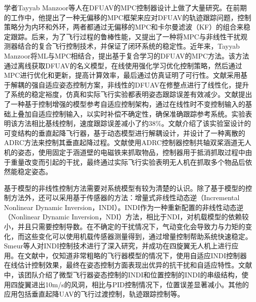 学者Tayyab Manzoor等人在DFUAV的MPC控制器设计上做了大量研究。在前期的工作中，他提出了一种无偏移的MPC框架来应对DFUAV的轨迹跟踪问题\cite{manzoorTrajectoryTrackingControl2020}，控制策略分为内环和外环，两者都通过无偏移的MPC和卡尔曼滤波（KF）的组合来稳定跟踪。后来，为了飞行过程的鲁棒性能，又提出了一种将MPC与非线性干扰观测器结合的复合飞行控制技术\cite{manzoorMPCBasedCompound2020,manzoorCompositeObserverbasedRobust2023}，并保证了闭环系统的稳定性。近年来，Tayyab Manzoor将ML与MPC相结合，提出基于复合学习的DFUAV的MPC方法\cite{manzoorModelPredictiveControl2023,manzoorCompoundLearningBasedModel2024}。该方法通过离线获取DFUAV的名义模型，在线使用强化学习优化控制策略，然后通过MPC进行优化和更新，提高计算效率，最后通过仿真证明了可行性。文献\parencite{zhaoModellingAttitudeControl2015}采用基于解耦的强自适应姿态控制方案，非线性的DFUAV在修整点进行了线性化，提升了系统的稳定裕度，仿真和实际飞行实验都表明姿态跟踪误差有效减少。文献\parencite{aiRobustAdaptiveControl2025}提出了一种基于控制增强的模型参考自适应控制架构，通过在线性时不变控制输入的基础上叠加自适应控制输入，以实时补偿不确定性，确保准确跟踪参考系统。实验表明该方法相比基线控制，速度跟踪误差减小了约38\%。文献\parencite{wenResearchVerticalTakeoff2021}介绍了该实验室设计的可变结构的垂直起降飞行器，基于动态模型进行解耦设计，并设计了一种离散的ADRC方法来控制其垂直起降过程。文献\parencite{yinDuctedFanUAV2024}使用ADRC控制器控制共轴双桨涵道无人机的姿态，使用固定于涵道壁的电磁铁来抓取物品，控制器用于抵消抓取过程中由于重量改变而引起的干扰，最终通过实际飞行实验表明无人机在抓取多个物品后依然能稳定姿态。

基于模型的非线性控制方法需要对系统模型有较为清楚的认识。除了基于模型的控制方法外，还可以采用基于传感器的方法：增量式非线性动态逆（Incremental Nonlinear Dynamic Inversion，INDI）。INDI作为一种重新配置的非线性动态逆（Nonlinear Dynamic Inversion，NDI）方法\cite{baconReconfigurableNDIController2001b,grondmanDesignFlightTesting}，相比于NDI，对机载模型的依赖较小，并且只需要控制导数。在不确定的干扰情况下，气动变化会导致力与力矩的变化，而这些变化可以使用机载传感器测量得到，通过增量控制帮助系统快速稳定。Smeur等人对INDI控制技术进行了深入研究\cite{smeurAdaptiveIncrementalNonlinear2015,smeurCascadedIncrementalNonlinear2018b,steffensenNonlinearDynamicInversion2023}，并成功在四旋翼无人机上进行应用。在文献\parencite{smeurAdaptiveIncrementalNonlinear2015}中，仅知道非常粗略的飞行器模型的情况下，使用自适应INDI控制器在线估计控制效果，最终在姿态控制方面表现出优异的抗干扰和自适应特性。文献\parencite{smeurCascadedIncrementalNonlinear2018b}中，该团队介绍了微型飞行器姿态控制的INDI和位置控制的INDI的串级结构，使用四旋翼进出10m/s的风洞，相比与PID控制情况下，位置误差显著减小。其他的应用包括垂直起降UAV的飞行过渡控制\cite{chengCorridorbasedFlightMode2023}，轨迹跟踪控制\cite{taherinezhadEnhancedIncrementalNonlinear2023a}等。

